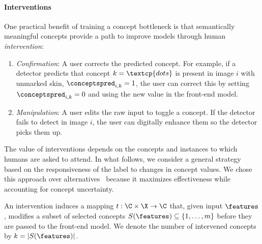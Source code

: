 \documentclass[11pt]{article}
\begin{document}


\paragraph{Interventions}

One practical benefit of training a concept bottleneck is that semantically meaningful concepts provide a path to improve models through human \emph{intervention}:
%
\begin{enumerate}
    
    \item \emph{Confirmation}: A user corrects the predicted concept. For example, if a detector predicts that concept $k = \textcp{dots}$ is present in image $i$ with unmarked skin, $\conceptspred_{i,k} = 1$, the user can correct this by setting $\conceptspred_{i,k} = 0$ and using the new value in the front-end model.
    
    \item \emph{Manipulation}: A user edits the raw input to toggle a concept. If the detector fails to detect  in image $i$, the user can digitally enhance them so the detector picks them up.
    
\end{enumerate}

The value of interventions depends on the concepts and instances to which humans are asked to attend. 
In what follows, we consider a general strategy based on the responsiveness of the label to changes in concept values. We chose this approach over alternatives~\citep{shin2023closer,shen2025adaptive} because it maximizes effectiveness while accounting for concept uncertainty. 

An intervention induces a mapping $t: \C \times \X \to\C$ that, given input $\features$, modifies a subset of selected concepts $S(\features) \subseteq \{1,\ldots,m\}$ before they are passed to the front-end model. We denote the number of intervened concepts by $k = |S(\features)|$.
\end{document}
